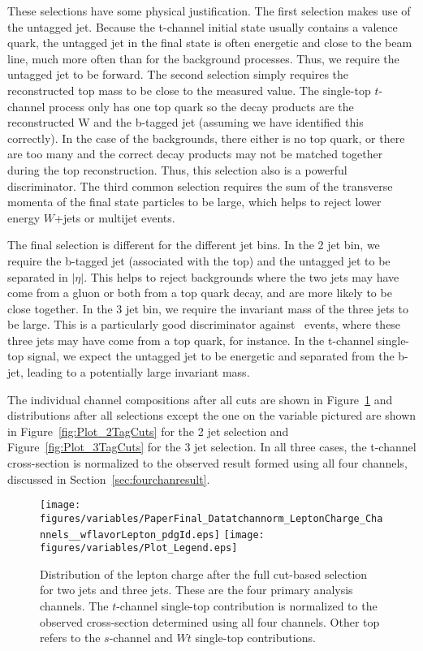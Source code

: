 These selections have some physical justification.  The first selection makes use of the untagged jet.  Because the t-channel initial state usually contains a valence quark, the untagged jet in the final state is often energetic and close to the beam line, much more often than for the background processes.  Thus, we require the untagged jet to be forward.  The second selection simply requires the reconstructed top mass to be close to the measured value.  The single-top $t$-channel process only has one top quark so the decay products are the reconstructed W and the b-tagged jet (assuming we have identified this correctly).  In the case of the backgrounds, there either is no top quark, or there are too many and the correct decay products may not be matched together during the top reconstruction.  Thus, this selection also is a powerful discriminator.  The third common selection requires the sum of the transverse momenta of the final state particles to be large, which helps to reject lower energy $W$+jets or multijet events.

The final selection is different for the different jet bins.  In the 2 jet bin, we require the b-tagged jet (associated with the top) and the untagged jet to be separated in $|\eta|$.  This  helps to reject backgrounds where the two jets may have come from a gluon or both from a top quark decay, and are more likely to be close together.  In the 3 jet bin, we require the invariant mass of the three jets to be large.  This is a particularly good discriminator against \ttbar~events, where these three jets may have come from a top quark, for instance.  In the t-channel single-top signal, we expect the untagged jet to be energetic and separated from the b-jet, leading to a potentially large invariant mass.

The individual channel compositions after all cuts are shown in Figure~\ref{fig:tch_cut_pdgid} and distributions after all selections except the one on the variable pictured are shown in Figure~\ref{fig:Plot_2TagCuts} for the 2 jet selection and Figure~\ref{fig:Plot_3TagCuts} for the 3 jet selection.  In all three cases, the t-channel cross-section is normalized to the observed result formed using all four channels, discussed in Section~\ref{sec:fourchanresult}.

\begin{figure}[!h!tpb]
 \centering
\texttt{[image: figures/variables/PaperFinal\_Datatchannorm\_LeptonCharge\_Channels\_\_wflavorLepton\_pdgId.eps]}
 \texttt{[image: figures/variables/Plot\_Legend.eps]}
 \caption{Distribution of the lepton charge after the full cut-based selection for two jets and three jets.  These are the four primary analysis channels. The $t$-channel single-top contribution is normalized to the observed cross-section determined using all four channels. Other top refers to the $s$-channel and $Wt$ single-top contributions.}
 \label{fig:tch_cut_pdgid}
 \end{figure}

